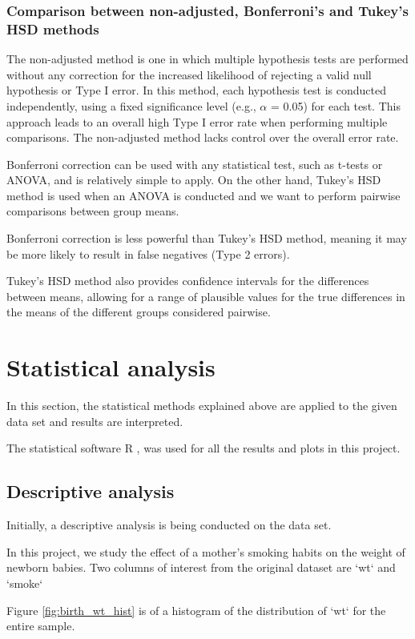 \documentclass[fontsize=12 pt]{scrartcl}
\begin{document}
\subsubsection{Comparison between non-adjusted, Bonferroni's and Tukey's HSD methods}

The non-adjusted method is one in which multiple hypothesis tests are performed without any correction for the increased likelihood of rejecting a valid null hypothesis or Type I error. In this method, each hypothesis test is conducted independently, using a fixed significance level (e.g., $\alpha$ = 0.05) for each test. This approach leads to an overall high Type I error rate when performing multiple comparisons. The non-adjusted method lacks control over the overall error rate.

Bonferroni correction can be used with any statistical test, such as t-tests or ANOVA, and is relatively simple to apply. On the other hand, Tukey's HSD method is used when an ANOVA is conducted and we want to perform pairwise comparisons between group means. 

Bonferroni correction is less powerful than Tukey's HSD method, meaning it may be more likely to result in false negatives (Type 2 errors).

Tukey's HSD method also provides confidence intervals for the differences between means, allowing for a range of plausible values for the true differences in the means of the different groups considered pairwise.

\section{Statistical analysis}
In this section, the statistical methods explained above are applied to the given data set and results are interpreted.

The statistical software R \citep{R}, was used for all the results and plots in this project. 


\subsection{Descriptive analysis}
Initially, a descriptive analysis is being conducted on the data set.

In this project, we study the effect of a mother's smoking habits on the weight of newborn babies. Two columns of interest from the original dataset are  `wt` and `smoke`

Figure \ref{fig:birth_wt_hist} is of a histogram of the distribution of `wt` for the entire sample.
\end{document}
